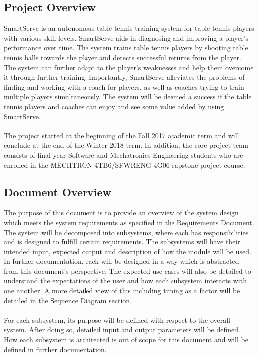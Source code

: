 \documentclass[11pt]{article}
\begin{document}
\subsection{Project Overview}
SmartServe is an autonomous table tennis training system for table tennis players with various skill levels. SmartServe aids in diagnosing and improving a player's performance over time. The system trains table tennis players by shooting table tennis balls towards the player and detects successful returns from the player. The system can further adapt to the player's weaknesses and help them overcome it through further training. Importantly, SmartServe alleviates the problems of finding and working with a coach for players, as well as coaches trying to train multiple players simultaneously. The system will be deemed a success if the table tennis players and coaches can enjoy and see some value added by using SmartServe.\\\\
The project started at the beginning of the Fall 2017 academic term and will conclude at the end of the Winter 2018 term. In addition, the core project team consists of final year Software and Mechatronics Engineering students who are enrolled in the MECHTRON 4TB6/SFWRENG 4G06 capstone project course.
\subsection{Document Overview}
The purpose of this document is to provide an overview of the system design which meets the system requirements as specified in the \href{run:../Requirements/Requirements.pdf}{Requirements Document}. The system will be decomposed into subsystems, where each has responsibilities and is designed to fulfill certain requirements. The subsystems will have their intended input, expected output and description of how the module will be used. In further documentation, each will be designed in a way which is abstracted from this document's perspective. The expected use cases will also be detailed to understand the expectations of the user and how each subsystem interacts with one another. A more detailed view of this including timing as a factor will be detailed in the Sequence Diagram section. \\ \\ %
For each subsystem, its purpose will be defined with respect to the overall system. After doing so, detailed input and output parameters will be defined. How each subsystem is architected is out of scope for this document and will be defined in further documentation. \\ \\
\end{document}
